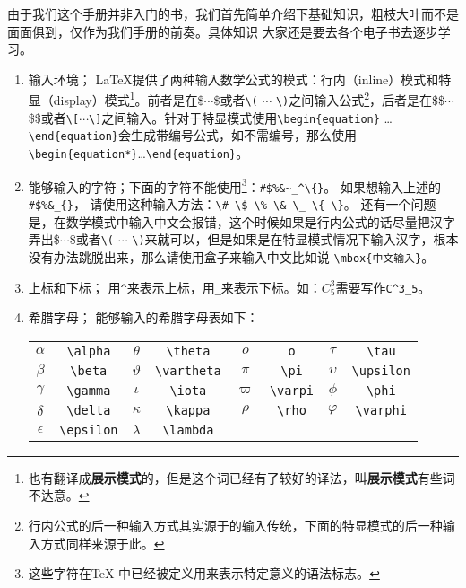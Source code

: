\documentclass{article}
\begin{document}
由于我们这个手册并非入门的书，我们首先简单介绍下基础知识，粗枝大叶而不是面面俱到，仅作为我们手册的前奏。具体知识
大家还是要去各个电子书去逐步学习。
\begin{enumerate}
\item 输入环境；
\LaTeX{}提供了两种输入数学公式的模式：行内（inline）模式和特显（display）模式\footnote{也有翻译成\textbf{展示模式}的，但是这个词已经有了较好的译法，叫\textbf{展示模式}有些词不达意。}。前者是在\$$\cdots$\$或者\verb|\(| $\cdots$ \verb|\)|之间输入公式\footnote{行内公式的后一种输入方式其实源于\AMSTEX 的输入传统，下面的特显模式的后一种输入方式同样来源于此。}，后者是在\$\$$\cdots$\$\$或者\verb|\[|$\cdots$\verb|\]|之间输入。针对于特显模式使用\verb|\begin{equation}| \ldots\verb|\end{equation}|会生成带编号公式，如不需编号，那么使用\verb|\begin{equation*}|\ldots \verb|\end{equation}|。
\item 能够输入的字符；下面的字符不能使用\footnote{这些字符在\TeX{} 中已经被定义用来表示特定意义的语法标志。}：\verb|#$%&~_^\{}|。
如果想输入上述的\verb|#$%&_{}|，
请使用这种输入方法：\verb|\# \$ \% \& \_ \{ \}|。
还有一个问题是，在数学模式中输入中文会报错，这个时候如果是行内公式的话尽量把汉字弄出\$$\cdots$\$或者\verb|\(| $\cdots$ \verb|\)|来就可以，但是如果是在特显模式情况下输入汉字，根本没有办法跳脱出来，那么请使用盒子来输入中文比如说
\verb|\mbox{中文输入}|。
\item 上标和下标；
用\verb|^|来表示上标，用\verb|_|来表示下标。如：$C^3_5$需要写作\verb|C^3_5|。
\item 希腊字母；
能够输入的希腊字母表如下：
\begin{center}
\begin{tabular}{cccccccc}
$\alpha$      & \verb|\alpha|      & $\theta$    & \verb|\theta|        &
        $o$         & \verb|o|        & $\tau$     & \verb|\tau| \\
    $\beta$       & \verb|\beta|       & $\vartheta$ & \verb|\vartheta| &
        $\pi$       & \verb|\pi|      & $\upsilon$ & \verb|\upsilon| \\
    $\gamma$      & \verb|\gamma|      & $\iota$     & \verb|\iota|     &
        $\varpi$    & \verb|\varpi|   & $\phi$     & \verb|\phi| \\
    $\delta$      & \verb|\delta|      & $\kappa$    & \verb|\kappa|    &
        $\rho$      & \verb|\rho|     & $\varphi$  & \verb|\varphi| \\
    $\epsilon$    & \verb|\epsilon|    & $\lambda$   & \verb|\lambda|   &

\end{tabular}
\end{center}
\end{enumerate}
\end{document}
